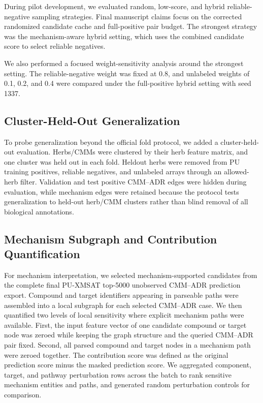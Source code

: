 \documentclass[manuscript,screen,review]{acmart}
\newcommand{\px}{PU-XMSAT}
\begin{document}
During pilot development, we evaluated random, low-score, and hybrid reliable-negative sampling strategies. Final manuscript claims focus on the corrected randomized candidate cache and full-positive pair budget. The strongest strategy was the mechanism-aware hybrid setting, which uses the combined candidate score to select reliable negatives.

We also performed a focused weight-sensitivity analysis around the strongest setting. The reliable-negative weight was fixed at 0.8, and unlabeled weights of 0.1, 0.2, and 0.4 were compared under the full-positive hybrid setting with seed 1337.

\subsection{Cluster-Held-Out Generalization}

To probe generalization beyond the official fold protocol, we added a cluster-held-out evaluation. Herbs/CMMs were clustered by their herb feature matrix, and one cluster was held out in each fold. Heldout herbs were removed from PU training positives, reliable negatives, and unlabeled arrays through an allowed-herb filter. Validation and test positive CMM--ADR edges were hidden during evaluation, while mechanism edges were retained because the protocol tests generalization to held-out herb/CMM clusters rather than blind removal of all biological annotations.

\subsection{Mechanism Subgraph and Contribution Quantification}

For mechanism interpretation, we selected mechanism-supported candidates from the complete final \px{} top-5000 unobserved CMM--ADR prediction export. Compound and target identifiers appearing in parseable paths were assembled into a local subgraph for each selected CMM--ADR case. We then quantified two levels of local sensitivity where explicit mechanism paths were available. First, the input feature vector of one candidate compound or target node was zeroed while keeping the graph structure and the queried CMM--ADR pair fixed. Second, all parsed compound and target nodes in a mechanism path were zeroed together. The contribution score was defined as the original prediction score minus the masked prediction score. We aggregated component, target, and pathway perturbation rows across the batch to rank sensitive mechanism entities and paths, and generated random perturbation controls for comparison.
\end{document}
